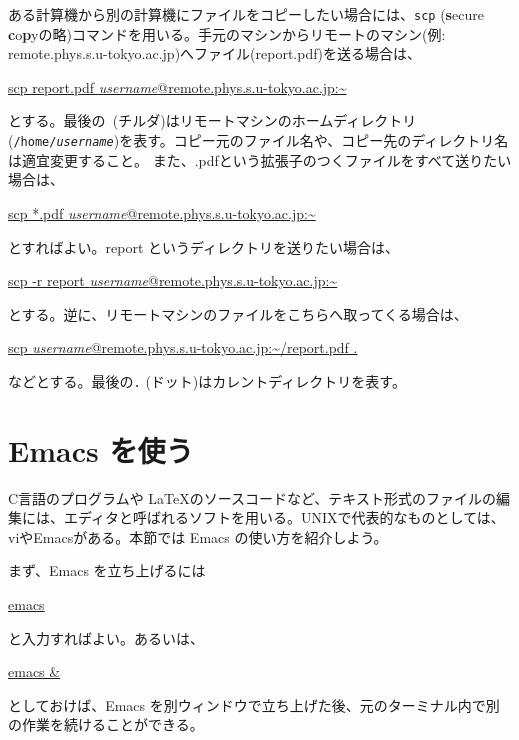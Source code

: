 ある計算機から別の計算機にファイルをコピーしたい場合には、{\tt scp} ({\bf s}ecure {\bf c}o{\bf p}yの略)コマンドを用いる。手元のマシンからリモートのマシン(例: remote.phys.s.u-tokyo.ac.jp)へファイル(report.pdf)を送る場合は、
\begin{commandline2}
\prompt \underline{scp report.pdf {\it username}@remote.phys.s.u-tokyo.ac.jp:\~{} }
\end{commandline2} \noindent
とする。最後の{\tt ~}(チルダ)はリモートマシンのホームディレクトリ({\tt /home/{\it username}})を表す。コピー元のファイル名や、コピー先のディレクトリ名は適宜変更すること。
また、.pdfという拡張子のつくファイルをすべて送りたい場合は、
\begin{commandline2}
\prompt \underline{scp *.pdf {\it username}@remote.phys.s.u-tokyo.ac.jp:\~{} }
\end{commandline2} \noindent
とすればよい。report というディレクトリを送りたい場合は、
\begin{commandline2}
\prompt \underline{scp -r report {\it username}@remote.phys.s.u-tokyo.ac.jp:\~{}}
\end{commandline2} \noindent
とする。逆に、リモートマシンのファイルをこちらへ取ってくる場合は、
\begin{commandline2}
\prompt \underline{scp {\it username}@remote.phys.s.u-tokyo.ac.jp:\~{}/report.pdf .}
\end{commandline2} \noindent
などとする。最後の{\tt .} (ドット)はカレントディレクトリを表す。

\section{Emacs を使う}

C言語のプログラムや \LaTeX のソースコードなど、テキスト形式のファイルの編集には、エディタと呼ばれるソフトを用いる。UNIXで代表的なものとしては、viやEmacsがある。本節では Emacs の使い方を紹介しよう。

まず、Emacs を立ち上げるには
\begin{commandline2}
\prompt \underline{emacs}
\end{commandline2} \noindent
と入力すればよい。あるいは、
\begin{commandline2}
\prompt \underline{emacs \&}
\end{commandline2} \noindent
としておけば、Emacs を別ウィンドウで立ち上げた後、元のターミナル内で別の作業を続けることができる。
